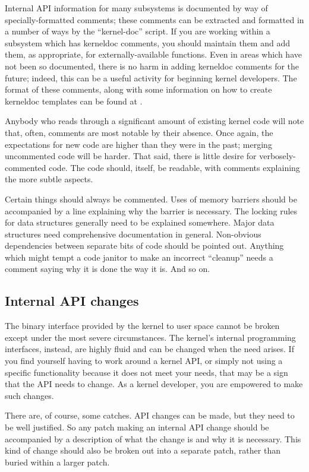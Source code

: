 \documentclass[a4paper,8pt,english]{sphinxmanual}
\begin{document}
Internal API information for many subsystems is documented by way of
specially-formatted comments; these comments can be extracted and formatted
in a number of ways by the ``kernel-doc'' script.  If you are working within
a subsystem which has kerneldoc comments, you should maintain them and add
them, as appropriate, for externally-available functions.  Even in areas
which have not been so documented, there is no harm in adding kerneldoc
comments for the future; indeed, this can be a useful activity for
beginning kernel developers.  The format of these comments, along with some
information on how to create kerneldoc templates can be found at
.

Anybody who reads through a significant amount of existing kernel code will
note that, often, comments are most notable by their absence.  Once again,
the expectations for new code are higher than they were in the past;
merging uncommented code will be harder.  That said, there is little desire
for verbosely-commented code.  The code should, itself, be readable, with
comments explaining the more subtle aspects.

Certain things should always be commented.  Uses of memory barriers should
be accompanied by a line explaining why the barrier is necessary.  The
locking rules for data structures generally need to be explained somewhere.
Major data structures need comprehensive documentation in general.
Non-obvious dependencies between separate bits of code should be pointed
out.  Anything which might tempt a code janitor to make an incorrect
``cleanup'' needs a comment saying why it is done the way it is.  And so on.


\subsection{Internal API changes}
\label{process/4.Coding:internal-api-changes}
The binary interface provided by the kernel to user space cannot be broken
except under the most severe circumstances.  The kernel's internal
programming interfaces, instead, are highly fluid and can be changed when
the need arises.  If you find yourself having to work around a kernel API,
or simply not using a specific functionality because it does not meet your
needs, that may be a sign that the API needs to change.  As a kernel
developer, you are empowered to make such changes.

There are, of course, some catches.  API changes can be made, but they need
to be well justified.  So any patch making an internal API change should be
accompanied by a description of what the change is and why it is
necessary.  This kind of change should also be broken out into a separate
patch, rather than buried within a larger patch.
\end{document}
